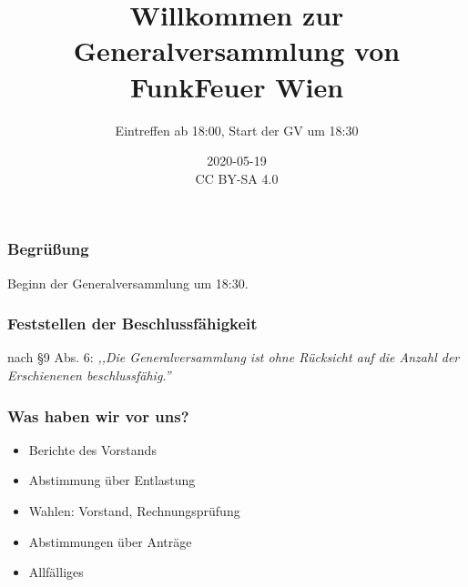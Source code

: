 \documentclass[17pt]{beamer} %
\title[]{Willkommen zur Generalversammlung von FunkFeuer Wien}
\subtitle[]{Eintreffen ab 18:00, Start der GV um 18:30}
\date[]{2020-05-19\\\tiny CC BY-SA 4.0}
\begin{document}
\frame{\titlepage}

%

\begin{frame}
	\frametitle{Begrüßung}
	Beginn der Generalversammlung um 18:30.
\end{frame}



\begin{frame}
	\frametitle{Feststellen der Beschlussfähigkeit}
	nach §9 Abs. 6:
	\textit{,,Die Generalversammlung ist ohne Rücksicht auf die Anzahl der
	Erschienenen beschlussfähig.''}
\end{frame}



\begin{frame}
	\frametitle{Was haben wir vor uns?}
	\begin{itemize}
		\item Berichte des Vorstands
		\item Abstimmung über Entlastung
		\item Wahlen: Vorstand, Rechnungsprüfung
		\item Abstimmungen über Anträge
		\item Allfälliges
	\end{itemize}
\end{frame}
\end{document}
